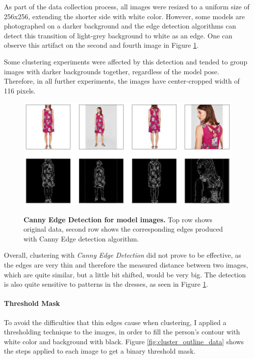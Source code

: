 \documentclass{article}
\begin{document}
As part of the data collection process, all images were resized to a uniform size of 256x256, extending the shorter side with white color. However, some models are photographed on a darker background and the edge detection algorithms can detect this transition of light-grey background to white as an edge. One can observe this artifact on the second and fourth image in Figure \ref{fig:cluster_edges_data}.

Some clustering experiments were affected by this detection and tended to group images with darker backgrounds together, regardless of the model pose. Therefore, in all further experiments, the images have center-cropped width of 116 pixels.

\begin{figure}[h]
\centering
{\includegraphics[width=\linewidth]{clustering/edges_data}}
\caption{\label{fig:cluster_edges_data} \textbf{Canny Edge Detection for model images.} Top row shows original data, second row shows the corresponding edges produced with Canny Edge detection algorithm.}
\end{figure}

Overall, clustering with \textit{Canny Edge Detection} did not prove to be effective, as the edges are very thin and therefore the measured distance between two images, which are quite similar, but a little bit shifted, would be very big. The detection is also quite sensitive to patterns in the dresses, as seen in Figure \ref{fig:cluster_edges_data}.

\paragraph{Threshold Mask}
To avoid the difficulties that thin edges cause when clustering, I applied a thresholding technique to the images, in order to fill the person's contour with white color and background with black. Figure \ref{fig:cluster_outline_data} shows the steps applied to each image to get a binary threshold mask.
\end{document}
